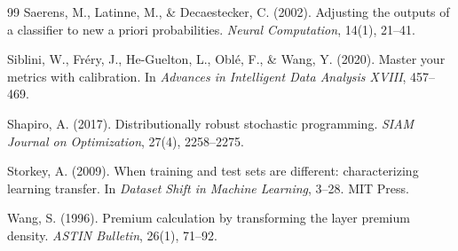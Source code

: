 \documentclass[11pt]{article}
\theoremstyle{remark}
\begin{document}
\begin{thebibliography}{99}
Saerens, M., Latinne, M., \& Decaestecker, C. (2002).
Adjusting the outputs of a classifier to new a priori probabilities.
\emph{Neural Computation}, 14(1), 21--41.

Siblini, W., Fr\'ery, J., He-Guelton, L., Obl\'e, F., \& Wang, Y. (2020).
Master your metrics with calibration.
In \emph{Advances in Intelligent Data Analysis XVIII}, 457--469.

Shapiro, A. (2017).
Distributionally robust stochastic programming.
\emph{SIAM Journal on Optimization}, 27(4), 2258--2275.

Storkey, A. (2009).
When training and test sets are different: characterizing learning transfer.
In \emph{Dataset Shift in Machine Learning}, 3--28. MIT Press.

Wang, S. (1996).
Premium calculation by transforming the layer premium density.
\emph{ASTIN Bulletin}, 26(1), 71--92.

\end{thebibliography}
\end{document}
